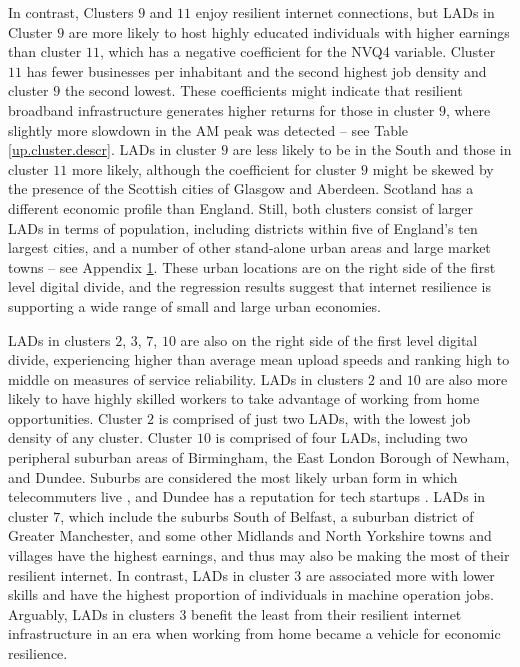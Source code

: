 \documentclass[Royal,times,sageh]{sagej}
\begin{document}
In contrast, Clusters \(9\) and \(11\) enjoy resilient internet
connections, but LADs in Cluster \(9\) are more likely to host highly
educated individuals with higher earnings than cluster \(11\), which has
a negative coefficient for the NVQ4 variable. Cluster \(11\) has fewer
businesses per inhabitant and the second highest job density and cluster
\(9\) the second lowest. These coefficients might indicate that
resilient broadband infrastructure generates higher returns for those in
cluster \(9\), where slightly more slowdown in the AM peak was detected
-- see Table \ref{up.cluster.descr}. LADs in cluster \(9\) are less
likely to be in the South and those in cluster \(11\) more likely,
although the coefficient for cluster \(9\) might be skewed by the
presence of the Scottish cities of Glasgow and Aberdeen. Scotland has a
different economic profile than England. Still, both clusters consist of
larger LADs in terms of population, including districts within five of
England's ten largest cities, and a number of other stand-alone urban
areas and large market towns -- see Appendix
\protect\hyperlink{appendix1}{1}. These urban locations are on the right
side of the first level digital divide, and the regression results
suggest that internet resilience is supporting a wide range of small and
large urban economies.

LADs in clusters \(2\), \(3\), \(7\), \(10\) are also on the right side
of the first level digital divide, experiencing higher than average mean
upload speeds and ranking high to middle on measures of service
reliability. LADs in clusters \(2\) and \(10\) are also more likely to
have highly skilled workers to take advantage of working from home
opportunities. Cluster \(2\) is comprised of just two LADs, with the
lowest job density of any cluster. Cluster \(10\) is comprised of four
LADs, including two peripheral suburban areas of Birmingham, the East
London Borough of Newham, and Dundee. Suburbs are considered the most
likely urban form in which telecommuters live \citep{e2018does}, and
Dundee has a reputation for tech startups \citep{technation2017}. LADs
in cluster \(7\), which include the suburbs South of Belfast, a suburban
district of Greater Manchester, and some other Midlands and North
Yorkshire towns and villages have the highest earnings, and thus may
also be making the most of their resilient internet. In contrast, LADs
in cluster \(3\) are associated more with lower skills and have the
highest proportion of individuals in machine operation jobs. Arguably,
LADs in clusters \(3\) benefit the least from their resilient internet
infrastructure in an era when working from home became a vehicle for
economic resilience.
\end{document}

